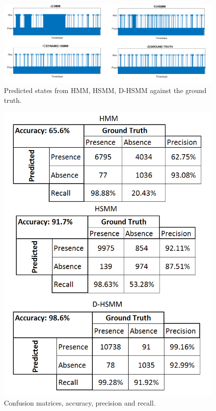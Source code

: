 \documentclass[conference]{IEEEtran}
\begin{document}
\begin{figure}[!t]
	\centering
	\includegraphics[width=\textwidth]{IMAGES.png}
	
	\caption{Predicted states from HMM, HSMM, D-HSMM against the ground truth.}
	\label{fig3}
\end{figure}

\begin{figure}[!t]
	\centering
	\includegraphics[width=\columnwidth]{confmat2.png}
	
	\caption{Confusion matrices, accuracy, precision and recall.}
	\label{fig6}
\end{figure}
\end{document}
